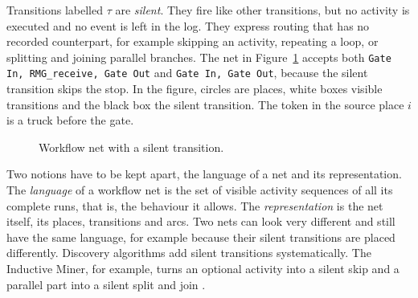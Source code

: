 Transitions labelled $\tau$ are \emph{silent}. They fire like other
transitions, but no activity is executed and no event is left in the log. They express routing that has no
recorded counterpart, for example skipping an activity, repeating a loop, or
splitting and joining parallel branches. The net in
Figure~\ref{fig:bg_petri_silent} accepts both \texttt{Gate In, RMG\_receive,
Gate Out} and \texttt{Gate In, Gate Out}, because the silent transition skips
the stop. In the figure, circles are places, white boxes visible transitions and the
black box the silent transition. The token in the source place $i$ is a truck
before the gate.

\begin{figure}[htbp]
\centering
{}
\caption{Workflow net with a silent transition.}
\label{fig:bg_petri_silent}
\end{figure}

Two notions have to be kept apart, the language of a net and its
representation. The \emph{language} of a workflow net is the set of visible
activity sequences of all its complete runs, that is, the behaviour it allows.
The \emph{representation} is the net itself, its places, transitions and arcs.
Two nets can look very different and still have the same language, for example
because their silent transitions are placed differently. Discovery algorithms
add silent transitions systematically. The Inductive Miner, for example, turns
an optional activity into a silent skip and a parallel part into a silent split
and join \cite{Leemans2014InductiveMiner}.

